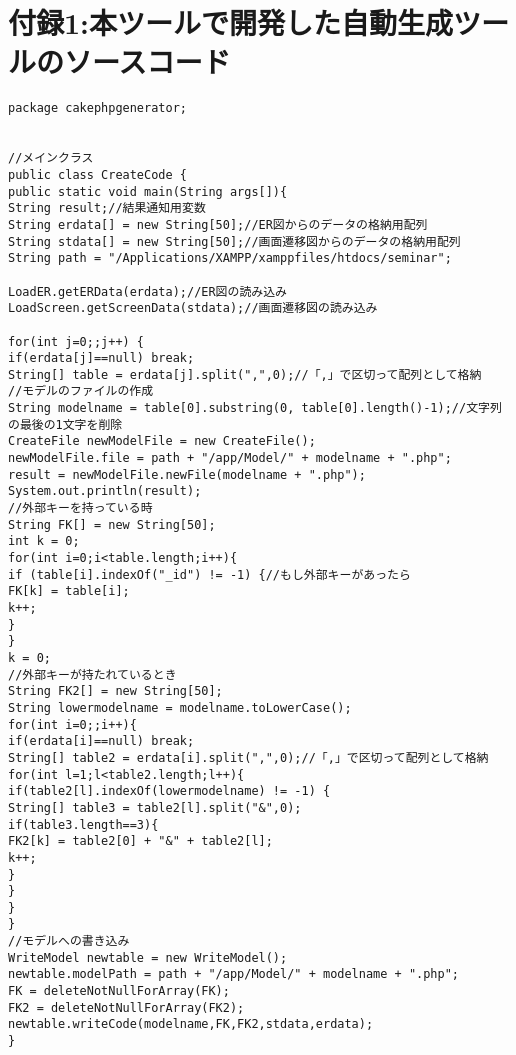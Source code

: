 \documentclass{funthesis}
\begin{document}
\chapter*{付録1:本ツールで開発した自動生成ツールのソースコード}
\begin{lstlisting}[caption=CreateCode.java,label=1]
package cakephpgenerator;


//メインクラス
public class CreateCode {
public static void main(String args[]){
String result;//結果通知用変数
String erdata[] = new String[50];//ER図からのデータの格納用配列
String stdata[] = new String[50];//画面遷移図からのデータの格納用配列
String path = "/Applications/XAMPP/xamppfiles/htdocs/seminar";

LoadER.getERData(erdata);//ER図の読み込み
LoadScreen.getScreenData(stdata);//画面遷移図の読み込み

for(int j=0;;j++) {
if(erdata[j]==null) break;
String[] table = erdata[j].split(",",0);//「,」で区切って配列として格納
//モデルのファイルの作成
String modelname = table[0].substring(0, table[0].length()-1);//文字列の最後の1文字を削除
CreateFile newModelFile = new CreateFile();
newModelFile.file = path + "/app/Model/" + modelname + ".php";
result = newModelFile.newFile(modelname + ".php");
System.out.println(result);
//外部キーを持っている時
String FK[] = new String[50];
int k = 0;
for(int i=0;i<table.length;i++){
if (table[i].indexOf("_id") != -1) {//もし外部キーがあったら
FK[k] = table[i]; 
k++;
}
}
k = 0;
//外部キーが持たれているとき
String FK2[] = new String[50];
String lowermodelname = modelname.toLowerCase();
for(int i=0;;i++){
if(erdata[i]==null) break;
String[] table2 = erdata[i].split(",",0);//「,」で区切って配列として格納
for(int l=1;l<table2.length;l++){
if(table2[l].indexOf(lowermodelname) != -1)	{
String[] table3 = table2[l].split("&",0);
if(table3.length==3){
FK2[k] = table2[0] + "&" + table2[l];
k++;
}
}
}
}
//モデルへの書き込み
WriteModel newtable = new WriteModel();
newtable.modelPath = path + "/app/Model/" + modelname + ".php";
FK = deleteNotNullForArray(FK);
FK2 = deleteNotNullForArray(FK2);
newtable.writeCode(modelname,FK,FK2,stdata,erdata);
}


\end{lstlisting}
\end{document}
